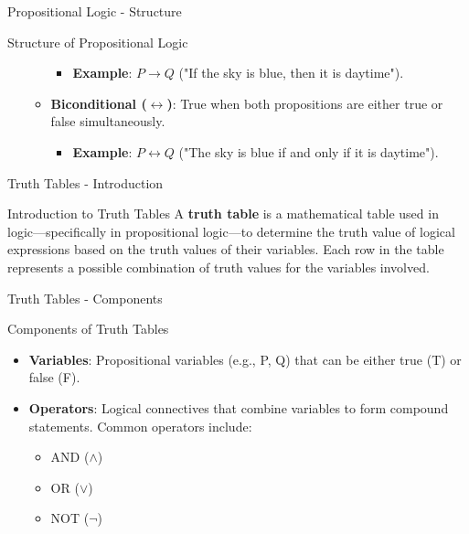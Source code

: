 \documentclass[aspectratio=169]{beamer}
\begin{document}
\begin{frame}[fragile]{Propositional Logic - Structure}
\begin{block}{Structure of Propositional Logic}
\begin{enumerate}
\begin{itemize}
                \begin{itemize}
                    \item \textbf{Example}: $P \rightarrow Q$ ("If the sky is blue, then it is daytime").
                \end{itemize}
                \item \textbf{Biconditional ($\leftrightarrow$)}: True when both propositions are either true or false simultaneously.
                \begin{itemize}
                    \item \textbf{Example}: $P \leftrightarrow Q$ ("The sky is blue if and only if it is daytime").
                \end{itemize}
            \end{itemize}
        \end{enumerate}
    \end{block}
\end{frame}

\begin{frame}[fragile]{Truth Tables - Introduction}
    \begin{block}{Introduction to Truth Tables}
        A \textbf{truth table} is a mathematical table used in logic—specifically in propositional logic—to determine the truth value of logical expressions based on the truth values of their variables. Each row in the table represents a possible combination of truth values for the variables involved.
    \end{block}
\end{frame}

\begin{frame}[fragile]{Truth Tables - Components}
    \begin{block}{Components of Truth Tables}
        \begin{itemize}
            \item \textbf{Variables}: Propositional variables (e.g., P, Q) that can be either true (T) or false (F).
            \item \textbf{Operators}: Logical connectives that combine variables to form compound statements. Common operators include:
            \begin{itemize}
                \item AND ($\land$)
                \item OR ($\lor$)
                \item NOT ($\neg$)
            \end{itemize}
        \end{itemize}
    \end{block}
\end{frame}
\end{document}
